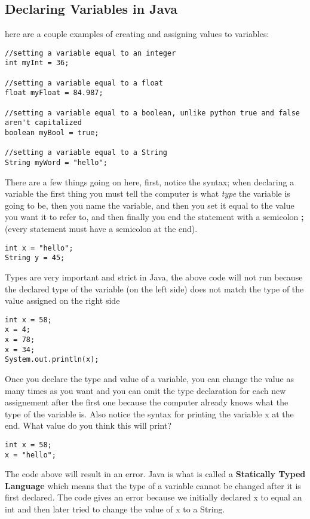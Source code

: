 \documentclass[14pt]{extreport}%
\begin{document}
\subsection*{Declaring Variables in Java}
here are a couple examples of creating and assigning values to variables:
\begin{lstlisting}
//setting a variable equal to an integer
int myInt = 36;

//setting a variable equal to a float
float myFloat = 84.987;

//setting a variable equal to a boolean, unlike python true and false aren't capitalized
boolean myBool = true;

//setting a variable equal to a String
String myWord = "hello";
\end{lstlisting}

There are a few things going on here, first, notice the syntax; when declaring a variable the first thing you must tell the computer is what \textit{type} the variable is going to be, then you name the variable, and then you set it equal to the value you want it to refer to, and then finally you end the statement with a semicolon \textbf{;} (every statement must have a semicolon at the end).

\begin{lstlisting}
int x = "hello";
String y = 45;
\end{lstlisting}

Types are very important and strict in Java, the above code will not run because the declared type of the variable (on the left side) does not match the type of the value assigned on the right side

\begin{lstlisting}
int x = 58;
x = 4;
x = 78;
x = 34;
System.out.println(x);
\end{lstlisting}
Once you declare the type and value of a variable, you can change the value as many times as you want and you can omit the type declaration for each new assignement after the first one because the computer already knows what the type of the variable is. Also notice the syntax for printing the variable x at the end. What value do you think this will print?

\begin{lstlisting}
int x = 58;
x = "hello";
\end{lstlisting}

The code above will result in an error. Java is what is called a \textbf{Statically Typed Language} which means that the type of a variable cannot be changed after it is first declared. The code gives an error because we initially declared x to equal an int and then later tried to change the value of x to a String.
\end{document}
